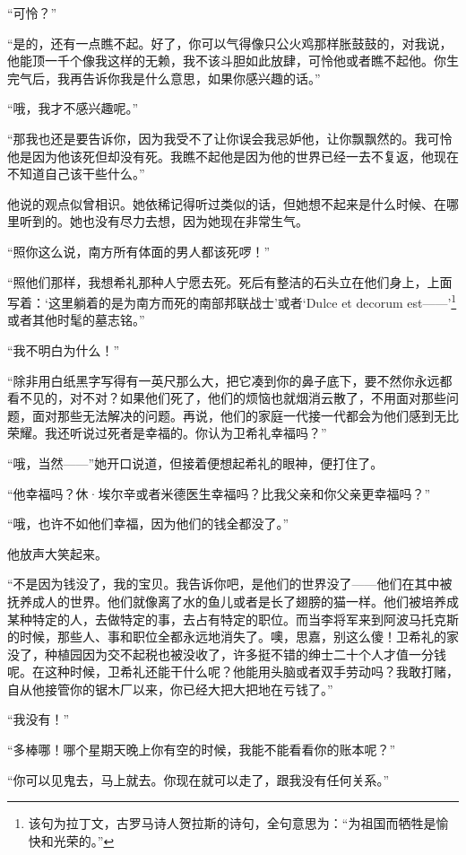 \par “可怜？”
\par “是的，还有一点瞧不起。好了，你可以气得像只公火鸡那样胀鼓鼓的，对我说，他能顶一千个像我这样的无赖，我不该斗胆如此放肆，可怜他或者瞧不起他。你生完气后，我再告诉你我是什么意思，如果你感兴趣的话。”
\par “哦，我才不感兴趣呢。”
\par “那我也还是要告诉你，因为我受不了让你误会我忌妒他，让你飘飘然的。我可怜他是因为他该死但却没有死。我瞧不起他是因为他的世界已经一去不复返，他现在不知道自己该干些什么。”
\par 他说的观点似曾相识。她依稀记得听过类似的话，但她想不起来是什么时候、在哪里听到的。她也没有尽力去想，因为她现在非常生气。
\par “照你这么说，南方所有体面的男人都该死啰！”
\par “照他们那样，我想希礼那种人宁愿去死。死后有整洁的石头立在他们身上，上面写着：‘这里躺着的是为南方而死的南部邦联战士’或者‘Dulce et decorum est——'\footnote{该句为拉丁文，古罗马诗人贺拉斯的诗句，全句意思为：“为祖国而牺牲是愉快和光荣的。”}或者其他时髦的墓志铭。”
\par “我不明白为什么！”
\par “除非用白纸黑字写得有一英尺那么大，把它凑到你的鼻子底下，要不然你永远都看不见的，对不对？如果他们死了，他们的烦恼也就烟消云散了，不用面对那些问题，面对那些无法解决的问题。再说，他们的家庭一代接一代都会为他们感到无比荣耀。我还听说过死者是幸福的。你认为卫希礼幸福吗？”
\par “哦，当然——”她开口说道，但接着便想起希礼的眼神，便打住了。
\par “他幸福吗？休·埃尔辛或者米德医生幸福吗？比我父亲和你父亲更幸福吗？”
\par “哦，也许不如他们幸福，因为他们的钱全都没了。”
\par 他放声大笑起来。
\par “不是因为钱没了，我的宝贝。我告诉你吧，是他们的世界没了——他们在其中被抚养成人的世界。他们就像离了水的鱼儿或者是长了翅膀的猫一样。他们被培养成某种特定的人，去做特定的事，去占有特定的职位。而当李将军来到阿波马托克斯的时候，那些人、事和职位全都永远地消失了。噢，思嘉，别这么傻！卫希礼的家没了，种植园因为交不起税也被没收了，许多挺不错的绅士二十个人才值一分钱呢。在这种时候，卫希礼还能干什么呢？他能用头脑或者双手劳动吗？我敢打赌，自从他接管你的锯木厂以来，你已经大把大把地在亏钱了。”
\par “我没有！”
\par “多棒哪！哪个星期天晚上你有空的时候，我能不能看看你的账本呢？”
\par “你可以见鬼去，马上就去。你现在就可以走了，跟我没有任何关系。”
